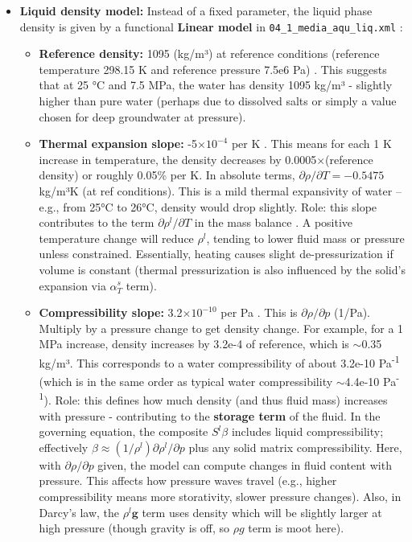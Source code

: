 \documentclass[10pt,a4paper]{article}
\begin{document}
\begin{itemize}
    \item \textbf{Liquid density model:} Instead of a fixed parameter, the liquid phase density is given by a functional \textbf{Linear model} in \texttt{04\_1\_media\_aqu\_liq.xml} \cite{file:04_1_media_aqu_liq}:
    \begin{itemize}
        \item \textbf{Reference density:} 1095 (kg/m³) at reference conditions (reference temperature 298.15 K and reference pressure 7.5e6 Pa) \cite{file:04_1_media_aqu_liq}. This suggests that at 25 °C and 7.5 MPa, the water has density 1095 kg/m³ - slightly higher than pure water (perhaps due to dissolved salts or simply a value chosen for deep groundwater at pressure).
        \item \textbf{Thermal expansion slope:} -5$\times 10^{-4}$ per K \cite{file:04_1_media_aqu_liq}. This means for each 1 K increase in temperature, the density decreases by 0.0005$\times$(reference density) or roughly 0.05\% per K. In absolute terms, $\partial \rho / \partial T = -0.5475$ kg/m³K (at ref conditions). This is a mild thermal expansivity of water – e.g., from 25°C to 26°C, density would drop slightly. Role: this slope contributes to the term $\partial \rho^l/\partial T$ in the mass balance \cite{ogs:trm}. A positive temperature change will reduce $\rho^l$, tending to lower fluid mass or pressure unless constrained. Essentially, heating causes slight de-pressurization if volume is constant (thermal pressurization is also influenced by the solid's expansion via $\alpha_T^s$ term).
        \item \textbf{Compressibility slope:} 3.2$\times 10^{-10}$ per Pa \cite{file:04_1_media_aqu_liq}. This is $\partial \rho / \partial p$ (1/Pa). Multiply by a pressure change to get density change. For example, for a 1 MPa increase, density increases by 3.2e-4 of reference, which is $\sim$0.35 kg/m³. This corresponds to a water compressibility of about 3.2e-10 Pa\textsuperscript{-1} (which is in the same order as typical water compressibility $\sim$4.4e-10 Pa\textsuperscript{-1}). Role: this defines how much density (and thus fluid mass) increases with pressure - contributing to the \textbf{storage term} of the fluid. In the governing equation, the composite $S^l \beta$ includes liquid compressibility; effectively $\beta \approx (1/\rho^l) \partial \rho^l/\partial p$ plus any solid matrix compressibility. Here, with $\partial \rho / \partial p$ given, the model can compute changes in fluid content with pressure. This affects how pressure waves travel (e.g., higher compressibility means more storativity, slower pressure changes). Also, in Darcy's law, the $\rho^l \mathbf{g}$ term uses density which will be slightly larger at high pressure (though gravity is off, so $\rho g$ term is moot here).

\end{itemize}
\end{itemize}
\end{document}
